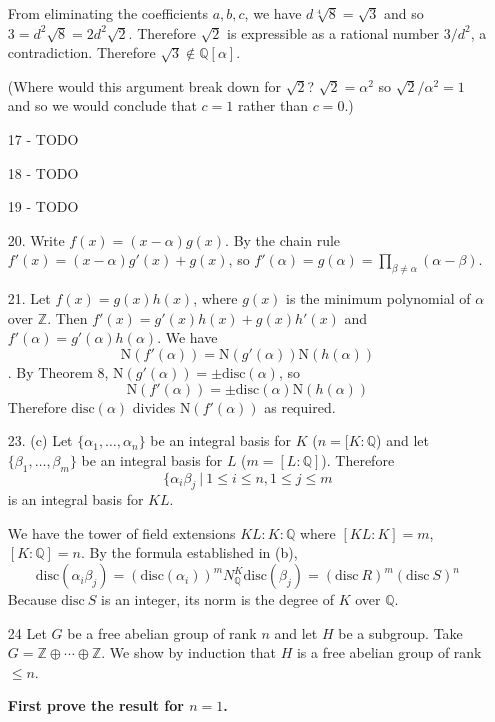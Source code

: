 \documentclass{article}
\newcommand{\Q}[0]{\mathbb{Q}}
\newcommand{\Z}[0]{\mathbb{Z}}
\newcommand{\qext}[1]{\mathbb{Q}[#1]}
\newcommand{\norm}[0]{\text{N}}
\newcommand{\disc}[1]{\text{disc}(#1)}
\begin{document}
\begin{enumerate}
From eliminating the coefficients $a, b, c$, we have $d\sqrt[4]{8} = \sqrt{3}$ and so $3 = d^2\sqrt{8} = 2d^2\sqrt{2}$.  Therefore $\sqrt{2}$ is expressible as a rational number $3/d^2$, a contradiction.  Therefore $\sqrt{3} \not\in \qext{\alpha}$.

(Where would this argument break down for $\sqrt{2}$?  $\sqrt{2} = \alpha^2$ so $\sqrt{2} / \alpha^2 = 1$ and so we would conclude that $c = 1$ rather than $c = 0$.)

\item[17 - TODO]

\item[18 - TODO]

\item[19 - TODO]

\item[20.] Write $f(x) = (x - \alpha)g(x)$.  By the chain rule $f'(x) = (x - \alpha)g'(x) + g(x)$, so $f'(\alpha) = g(\alpha) = \prod_{\beta \neq \alpha} (\alpha - \beta)$.

\item[21.] Let $f(x) = g(x) h(x)$, where $g(x)$ is the minimum polynomial of $\alpha$ over $\mathbb{Z}$.  Then $f'(x) = g'(x)h(x) + g(x) h'(x)$ and $f'(\alpha) = g'(\alpha)h(\alpha)$.  We have \[ \norm(f'(\alpha)) = \norm(g'(\alpha))\norm(h(\alpha)) \].  By Theorem 8, $\norm(g'(\alpha)) = \pm \disc{\alpha}$, so \[ \norm(f'(\alpha)) = \pm \disc{\alpha}\norm(h(\alpha)) \]
Therefore $\disc{\alpha}$ divides $\norm(f'(\alpha))$ as required.

\item[23. (c)] Let $\{ \alpha_1, \ldots, \alpha_n \}$ be an integral basis for $K$ ($n = [K : \Q$) and let $\{ \beta_1, \ldots, \beta_m \}$ be an integral basis for $L$ ($m = [L : \Q]$).  Therefore \[ \{ \alpha_i \beta_j \ |\ 1 \le i \le n, 1 \le j \le m \] is an integral basis for $KL$.

We have the tower of field extensions $KL : K : \Q$ where $[KL : K] = m$, $[K : \Q] = n$.  By the formula established in (b), \[ \disc{\alpha_i \beta_j} = (\disc{\alpha_i})^m N^{K}_{\Q} \disc{\beta_j} = (\text{disc}\ R)^m (\text{disc}\ S)^n \]
Because $\text{disc}\ S$ is an integer, its norm is the degree of $K$ over $\Q$.

\item[24]  Let $G$ be a free abelian group of rank $n$ and let $H$ be a subgroup.  Take $G = \Z \oplus \cdots \oplus \Z$.  We show by induction that $H$ is a free abelian group of rank $\leq n$.

{\bf First prove the result for $n = 1$.}


\end{enumerate}
\end{document}
